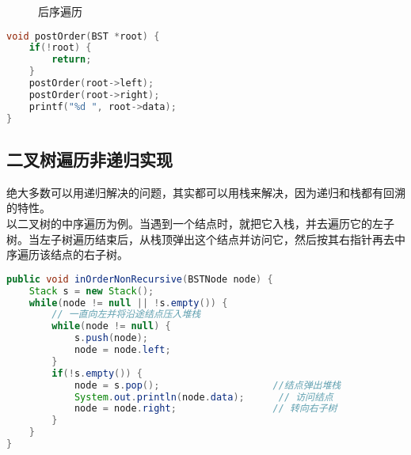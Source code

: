 \begin{figure}[H]
    \centering
    \caption{后序遍历}
\end{figure}


\begin{lstlisting}[language=C]
void postOrder(BST *root) {
    if(!root) {
        return;
    }
    postOrder(root->left);
    postOrder(root->right);
    printf("%d ", root->data);
}
\end{lstlisting}

\subsection{二叉树遍历非递归实现}

绝大多数可以用递归解决的问题，其实都可以用栈来解决，因为递归和栈都有回溯的特性。 \\

以二叉树的中序遍历为例。当遇到一个结点时，就把它入栈，并去遍历它的左子树。当左子树遍历结束后，从栈顶弹出这个结点并访问它，然后按其右指针再去中序遍历该结点的右子树。 \\


\begin{lstlisting}[language=Java]
public void inOrderNonRecursive(BSTNode node) {
    Stack s = new Stack();
    while(node != null || !s.empty()) {
        // 一直向左并将沿途结点压入堆栈
        while(node != null) {
            s.push(node);
            node = node.left;
        }
        if(!s.empty()) {
            node = s.pop();					   //结点弹出堆栈
            System.out.println(node.data);		// 访问结点
            node = node.right;				   // 转向右子树
        }
    }
}
\end{lstlisting}


